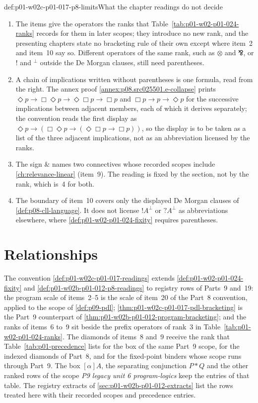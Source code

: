 \begin{hbwarning}{def:p01-w02c-p01-017-p8-limits}{What the chapter readings do not decide}
\begin{enumerate}
\item The items give the operators the ranks that
  Table~\ref{tab:p01-w02-p01-024-ranks} records for them in later
  scopes; they introduce no new rank, and the presenting chapters state
  no bracketing rule of their own except where item~2 and item~10 say
  so.  Different operators of the same rank, such as \(\otimes\) and
  \(\bindnasrepma\), or \(!\) and \({}^\perp\) outside the De Morgan
  clauses, still need parentheses.
\item A chain of implications written without parentheses is one formula,
  read from the right.  The annex proof
  \cref{annex:p08.src025501.e-collapse} prints
  \(\Diamond p\to\Box\Diamond p\to\Diamond\Box p\to\Box p\) and
  \(\Box p\to p\to\Diamond p\) for the successive implications between
  adjacent members, each of which it derives separately; the convention
  reads the first display as
  \(\Diamond p\to(\Box\Diamond p\to(\Diamond\Box p\to\Box p))\), so the
  display is to be taken as a list of the three adjacent implications,
  not as an abbreviation licensed by the ranks.
\item The sign \(\&\) names two connectives whose recorded scopes
  include \cref{ch:relevance-linear} (item~9).  The reading is fixed by
  the section, not by the rank, which is~4 for both.
\item The boundary of item~10 covers only the displayed De Morgan clauses
  of \cref{def:p08-cll-language}.  It does not license \(!A^\perp\) or
  \(?A^\perp\) as abbreviations elsewhere, where
  \cref{def:p01-w02-p01-024-fixity} requires parentheses.
\end{enumerate}
\end{hbwarning}

\section{Relationships}
\label{sec:p01-w02c-p01-017-relationships}

The convention \cref{def:p01-w02c-p01-017-readings} extends
\cref{def:p01-w02-p01-024-fixity} and
\cref{def:p01-w02b-p01-012-p8-readings} to registry rows of Parts~9
and~19: the program scale of items~2--5 is the scale of item~20 of the
Part~8 convention, applied to the scope of \cref{def:p09-pdl};
\cref{thm:p01-w02c-p01-017-pdl-bracketing} is the Part~9 counterpart of
\cref{thm:p01-w02b-p01-012-program-bracketing}; and the ranks of items~6
to~9 sit beside the prefix operators of rank~3 in
Table~\ref{tab:p01-w02-p01-024-ranks}.  The diamonds of items~8 and~9
receive the rank that Table~\ref{tab:p01-precedence} lists for the box
of the same Part~9 scope, for the indexed diamonds of Part~8, and for
the fixed-point binders whose scope runs through Part~9.  The box \([\alpha]A\), the
separating conjunction \(P*Q\) and the other ranked rows of the scope
\emph{P9 legacy unit 6 program-logics} keep the entries of that table.
The registry extracts of \cref{sec:p01-w02b-p01-012-extracts} list the
rows treated here with their recorded scopes and precedence entries.

